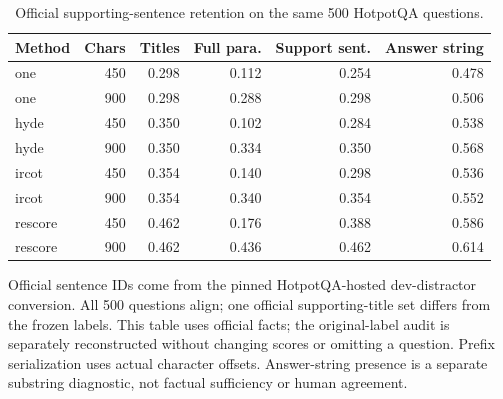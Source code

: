 \begin{table}[!htbp]
\centering\footnotesize
\caption{Official supporting-sentence retention on the same 500 HotpotQA questions.}
\label{tab:supporting_sentence_audit}
\begin{threeparttable}
\setlength{\tabcolsep}{3pt}
\begin{tabular}{lrrrrr}
\toprule
Method & Chars & Titles & Full para. & Support sent. & Answer string \\
\midrule
one & 450 & 0.298 & 0.112 & 0.254 & 0.478 \\
one & 900 & 0.298 & 0.288 & 0.298 & 0.506 \\
hyde & 450 & 0.350 & 0.102 & 0.284 & 0.538 \\
hyde & 900 & 0.350 & 0.334 & 0.350 & 0.568 \\
ircot & 450 & 0.354 & 0.140 & 0.298 & 0.536 \\
ircot & 900 & 0.354 & 0.340 & 0.354 & 0.552 \\
rescore & 450 & 0.462 & 0.176 & 0.388 & 0.586 \\
rescore & 900 & 0.462 & 0.436 & 0.462 & 0.614 \\
\bottomrule
\end{tabular}
\begin{tablenotes}\scriptsize\item Official sentence IDs come from the pinned HotpotQA-hosted dev-distractor conversion. All 500 questions align; one official supporting-title set differs from the frozen labels. This table uses official facts; the original-label audit is separately reconstructed without changing scores or omitting a question. Prefix serialization uses actual character offsets. Answer-string presence is a separate substring diagnostic, not factual sufficiency or human agreement.
\end{tablenotes}
\end{threeparttable}
\end{table}
